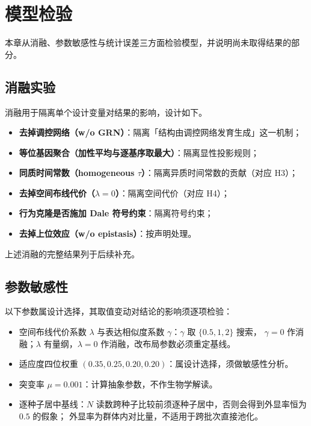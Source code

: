 \section{模型检验}\label{sec:validation}

本章从消融、参数敏感性与统计误差三方面检验模型，并说明尚未取得结果的部分。

\subsection{消融实验}

消融用于隔离单个设计变量对结果的影响，设计如下。

\begin{itemize}
  \item \textbf{去掉调控网络（w/o GRN）}：隔离「结构由调控网络发育生成」这一机制；
  \item \textbf{等位基因聚合（加性平均与逐基序取最大）}：隔离显性投影规则；
  \item \textbf{同质时间常数（homogeneous $\tau$）}：隔离异质时间常数的贡献（对应 H3）；
  \item \textbf{去掉空间布线代价（$\lambda=0$）}：隔离空间代价（对应 H4）；
  \item \textbf{行为克隆是否施加 Dale 符号约束}：隔离符号约束；
  \item \textbf{去掉上位效应（w/o epistasis）}：按声明处理。
\end{itemize}

上述消融的完整结果列于后续补充。

\subsection{参数敏感性}

以下参数属设计选择，其取值变动对结论的影响须逐项检验：

\begin{itemize}
  \item 空间布线代价系数 $\lambda$ 与表达相似度系数 $\gamma$：$\gamma$ 取 $\{0.5,1,2\}$ 搜索，
        $\gamma=0$ 作消融；$\lambda$ 有量纲，$\lambda=0$ 作消融，改布局参数必须重定基线。
  \item 适应度四位权重 $(0.35,0.25,0.20,0.20)$：属设计选择，须做敏感性分析。
  \item 突变率 $\mu=0.001$：计算抽象参数，不作生物学解读。
  \item 逐种子居中基线：$N$ 读数跨种子比较前须逐种子居中，否则会得到外显率恒为 $0.5$ 的假象；
        外显率为群体内对比量，不适用于跨批次直接池化。
\end{itemize}

